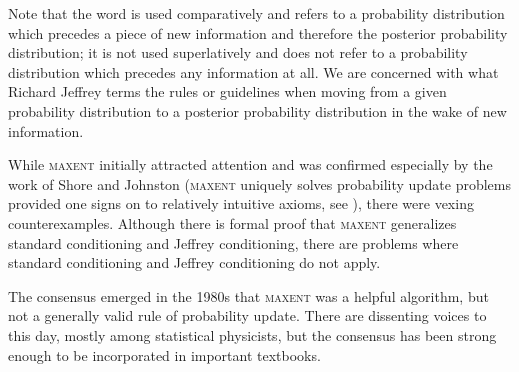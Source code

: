 \documentclass[11pt]{article}
\begin{document}
Note that the word  is used comparatively and refers to a
probability distribution which precedes a piece of new information and
therefore the posterior probability distribution; it is not used
superlatively and does not refer to a probability distribution which
precedes any information at all. We are concerned with what Richard
Jeffrey terms  the rules or guidelines
when moving from a given probability distribution to a posterior
probability distribution in the wake of new information.

While \textsc{maxent} initially attracted attention and was confirmed
especially by the work of Shore and Johnston (\textsc{maxent} uniquely
solves probability update problems provided one signs on to relatively
intuitive axioms, see ), there were vexing
counterexamples. Although there is formal proof that \textsc{maxent}
generalizes standard conditioning and Jeffrey conditioning, there are
problems where standard conditioning and Jeffrey conditioning do not
apply.

The consensus emerged in the 1980s that \textsc{maxent} was a helpful
algorithm, but not a generally valid rule of probability update. There
are dissenting voices to this day, mostly among statistical
physicists, but the consensus has been strong enough to be
incorporated in important textbooks.
\end{document}
